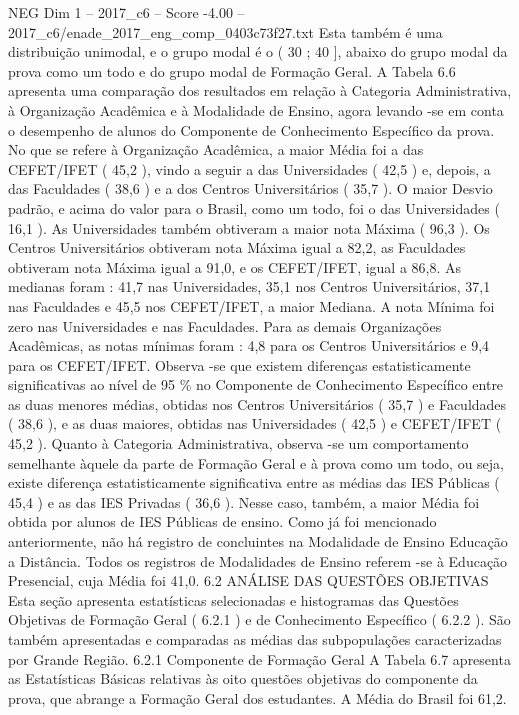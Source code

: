 \begin{textsample}{NEG Dim 1 – 2017\_c6 – Score -4.00 – 2017\_c6/enade\_2017\_eng\_comp\_0403c73f27.txt}
Esta também é uma distribuição unimodal, e o grupo modal é o ( 30 ; 40 ], abaixo do grupo modal da prova como um todo e do grupo modal de Formação Geral.
A Tabela 6.6 apresenta uma comparação dos resultados em relação à Categoria Administrativa, à Organização Acadêmica e à Modalidade de Ensino, agora levando -se em conta o desempenho de alunos do Componente de Conhecimento Específico da prova.
No que se refere à Organização Acadêmica, a maior Média foi a das CEFET/IFET ( 45,2 ), vindo a seguir a das Universidades ( 42,5 ) e, depois, a das Faculdades ( 38,6 ) e a dos Centros Universitários ( 35,7 ).
O maior Desvio padrão, e acima do valor para o Brasil, como um todo, foi o das Universidades ( 16,1 ).
As Universidades também obtiveram a maior nota Máxima ( 96,3 ).
Os Centros Universitários obtiveram nota Máxima igual a 82,2, as Faculdades obtiveram nota Máxima igual a 91,0, e os CEFET/IFET, igual a 86,8.
As medianas foram : 41,7 nas Universidades, 35,1 nos Centros Universitários, 37,1 nas Faculdades e 45,5 nos CEFET/IFET, a maior Mediana.
A nota Mínima foi zero nas Universidades e nas Faculdades.
Para as demais Organizações Acadêmicas, as notas mínimas foram : 4,8 para os Centros Universitários e 9,4 para os CEFET/IFET.
Observa -se que existem diferenças estatisticamente significativas ao nível de 95 \% no Componente de Conhecimento Específico entre as duas menores médias, obtidas nos Centros Universitários ( 35,7 ) e Faculdades ( 38,6 ), e as duas maiores, obtidas nas Universidades ( 42,5 ) e CEFET/IFET ( 45,2 ).
Quanto à Categoria Administrativa, observa -se um comportamento semelhante àquele da parte de Formação Geral e à prova como um todo, ou seja, existe diferença estatisticamente significativa entre as médias das IES Públicas ( 45,4 ) e as das IES Privadas ( 36,6 ).
Nesse caso, também, a maior Média foi obtida por alunos de IES Públicas de ensino.
Como já foi mencionado anteriormente, não há registro de concluintes na Modalidade de Ensino Educação a Distância.
Todos os registros de Modalidades de Ensino referem -se à Educação Presencial, cuja Média foi 41,0. 6.2 ANÁLISE DAS QUESTÕES OBJETIVAS Esta seção apresenta estatísticas selecionadas e histogramas das Questões Objetivas de Formação Geral ( 6.2.1 ) e de Conhecimento Específico ( 6.2.2 ).
São também apresentadas e comparadas as médias das subpopulações caracterizadas por Grande Região. 6.2.1 Componente de Formação Geral A Tabela 6.7 apresenta as Estatísticas Básicas relativas às oito questões objetivas do componente da prova, que abrange a Formação Geral dos estudantes.
A Média do Brasil foi 61,2.

\end{textsample}
